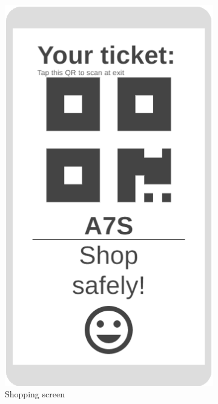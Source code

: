 \begin{figure}[h!]
	\centering
	\begin{subfigure}[b]{0.3\textwidth}
		\includegraphics[width=\linewidth]{../Diagrams/WireframesCLup/Exit.png}
		\caption{Shopping screen}
		\label{fig:WfExit}
	\end{subfigure}
	\hspace{1em}
	\begin{subfigure}[b]{0.3\textwidth}

\end{subfigure}
\end{figure}

